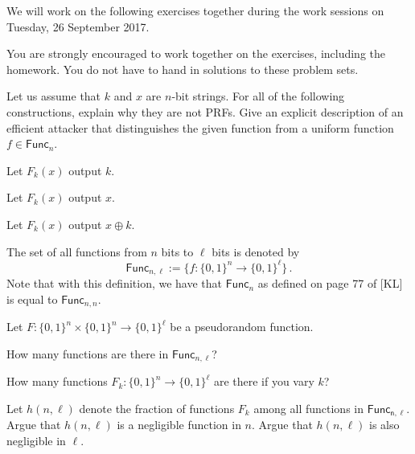 \documentclass[a4paper,10pt,landscape,twocolumn]{scrartcl}
\newcommand\worksession{Tuesday, 26 September 2017}
\begin{document}
\problems


{\sffamily\noindent
We will work on the following exercises together during the work sessions on \worksession.

You are strongly encouraged to work together on the exercises, including the homework. You do not have to hand in solutions to these problem sets.}



\begin{exercise}
Let us assume that $k$ and $x$ are $n$-bit strings. For all of the following constructions, explain why they are not PRFs. Give an explicit description of an efficient attacker that distinguishes the given function from a uniform function $f \in \mathsf{Func}_n$.

\begin{subex}
Let $F_k(x)$ output $k$.
\end{subex}

\begin{subex}
Let $F_k(x)$ output $x$.
\end{subex}

\begin{subex}
Let $F_k(x)$ output $x \oplus k$.
\end{subex}

\end{exercise}

\begin{exercise}
The set of all functions from $n$ bits to $\ell$ bits is denoted by
\[ \mathsf{Func}_{n,\ell} := \big\{f:\{0,1\}^n \rightarrow \{0,1\}^{\ell} \big\} \, .
\]
Note that with this definition, we have that $\mathsf{Func}_n$ as defined on page 77 of [KL] is equal to $\mathsf{Func}_{n,n}$.

Let $F:\{0,1\}^n \times \{0,1\}^n \rightarrow \{0,1\}^\ell$ be a pseudorandom function.

\begin{subex}
How many functions are there in $\mathsf{Func}_{n,\ell}$?
\end{subex}

\begin{subex}
How many functions $F_k:\{0,1\}^n \rightarrow \{0,1\}^\ell$ are there if you vary $k$?
\end{subex}

\begin{subex}
Let $h(n,\ell)$ denote the fraction of functions $F_k$ among all functions in $\mathsf{Func_{n,\ell}}$. Argue that $h(n, \ell)$ is a negligible function in $n$. Argue that $h(n,\ell)$ is also negligible in $\ell$.
\end{subex}

\end{exercise}
\end{document}
